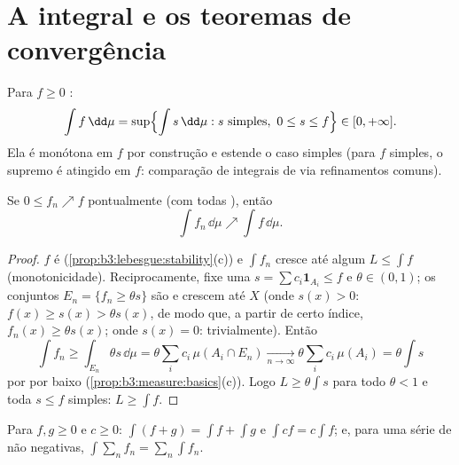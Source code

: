 \section{A integral e os teoremas de convergência}

\begin{definition}\label{def:b3:lebesgue:integral}
Para $f \geq 0$ :
\[
\int f \,\dd\mu = \sup\Bigl\{\int s\,\dd\mu : s \text{ simples},
\ 0 \leq s \leq f\Bigr\} \in [0, +\infty].
\]
Ela é monótona em $f$ por construção e estende o caso simples (para
$f$ simples, o supremo é atingido em $f$: comparação de integrais
de  via refinamentos comuns).
\end{definition}

\begin{theorem}
\label{thm:b3:lebesgue:mct}
Se $0 \leq f_n \nearrow f$ pontualmente (com todas ), então
\[
\int f_n\,\dd\mu \nearrow \int f\,\dd\mu .
\]
\end{theorem}

\begin{proof}
$f$ é  (\cref{prop:b3:lebesgue:stability}(c)) e $\int f_n$ cresce até algum $L \leq \int f$
(monotonicidade). Reciprocamente, fixe uma  $s = \sum c_i\mathbf 1_{A_i} \leq f$ e $\theta \in (0,1)$;
os conjuntos $E_n = \{f_n \geq \theta s\}$ são  e crescem até $X$ (onde $s(x) > 0$:
$f(x)
\geq s(x) > \theta s(x)$, de modo que, a partir de certo índice, $f_n(x) \geq \theta
s(x)$; onde $s(x) = 0$:
trivialmente). Então
\[
\int f_n \geq \int_{E_n}\theta s\,\dd\mu
= \theta\sum_i c_i\,\mu(A_i \cap E_n)
\xrightarrow[n\to\infty]{} \theta\sum_ic_i\,\mu(A_i)
= \theta\int s
\]
por  por baixo (\cref{prop:b3:measure:basics}(c)). Logo $L \geq \theta\int s$ para todo
$\theta < 1$ e toda $s
\leq f$ simples: $L \geq \int f$.
\end{proof}

\begin{corollary}\label{cor:b3:lebesgue:additivity}
Para $f, g \geq 0$  e $c \geq 0$: $\int(f + g) =
\int f + \int g$ e $\int cf = c\int f$; e, para uma série de
 não negativas, $\int\sum_nf_n =
\sum_n\int f_n$.
\end{corollary}

